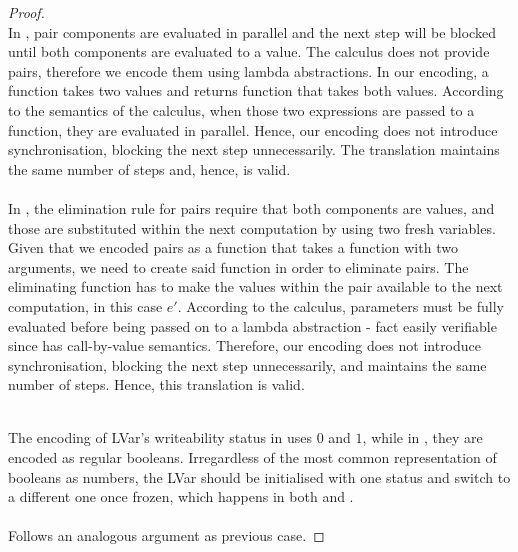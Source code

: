 \documentclass[main.tex]{subfiles}
\begin{document}
\begin{proof}

   \\
  In \typedlvar, pair components are evaluated in parallel and the next step will
  be blocked until both components are evaluated to a value. The \lvar calculus
  does not provide pairs, therefore we encode them using lambda abstractions.
  In our encoding, a function takes two values and returns function that takes
  both values. According to the semantics of the \lvar  calculus, when those two
  expressions are passed to a function, they are evaluated in parallel. Hence,
  our encoding does not introduce synchronisation, blocking the next step
  unnecessarily. The translation maintains the same number of steps and, hence,
  is valid. \\

   \\
  In \typedlvar, the elimination rule for pairs require that both components are
  values, and those are substituted within the next computation by using two
  fresh variables. Given that we encoded pairs as a function that takes a
  function with two arguments, we need to create said function in order to
  eliminate pairs. The eliminating function has to make the values within the
  pair available to the next computation, in this case $e'$. According to the
  \lvar calculus, parameters must be fully evaluated before being passed on to a
  lambda abstraction - fact easily verifiable since \lvar  has call-by-value
  semantics. Therefore, our encoding does not introduce synchronisation, blocking
  the next step unnecessarily, and maintains the same number of steps. Hence,
  this translation is valid. \\



   \\
  The encoding of LVar's writeability status in \typedlvar uses $0$ and $1$,
  while in \lvar, they are encoded as regular booleans. Irregardless of the most
  common representation of booleans as numbers, the LVar should be initialised
  with one status and switch to a different one once frozen, which happens in
  both \lvar and \typedlvar.\\

  \\
  Follows an analogous argument as previous case.

\end{proof}
\end{document}
